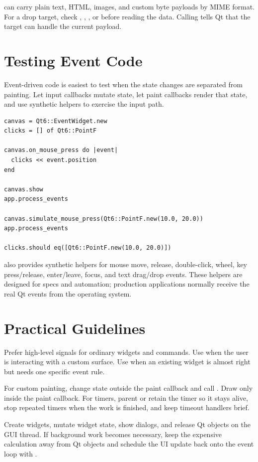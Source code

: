  can carry plain text, HTML, images, and custom byte payloads by MIME format. For a drop target, check , , , or  before reading the data. Calling  tells Qt that the target can handle the current payload.

\section{Testing Event Code}

Event-driven code is easiest to test when the state changes are separated from painting. Let input callbacks mutate state, let paint callbacks render that state, and use synthetic helpers to exercise the input path.

\begin{lstlisting}[style=crystal]
canvas = Qt6::EventWidget.new
clicks = [] of Qt6::PointF

canvas.on_mouse_press do |event|
  clicks << event.position
end

canvas.show
app.process_events

canvas.simulate_mouse_press(Qt6::PointF.new(10.0, 20.0))
app.process_events

clicks.should eq([Qt6::PointF.new(10.0, 20.0)])
\end{lstlisting}

 also provides synthetic helpers for mouse move, release, double-click, wheel, key press/release, enter/leave, focus, and text drag/drop events. These helpers are designed for specs and automation; production applications normally receive the real Qt events from the operating system.

\section{Practical Guidelines}

Prefer high-level signals for ordinary widgets and commands. Use  when the user is interacting with a custom surface. Use  when an existing widget is almost right but needs one specific event rule.

For custom painting, change state outside the paint callback and call . Draw only inside the paint callback. For timers, parent or retain the timer so it stays alive, stop repeated timers when the work is finished, and keep timeout handlers brief.

Create widgets, mutate widget state, show dialogs, and release Qt objects on the GUI thread. If background work becomes necessary, keep the expensive calculation away from Qt objects and schedule the UI update back onto the event loop with .

